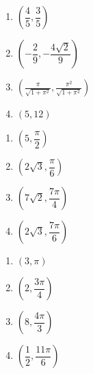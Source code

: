 \documentclass{ximera}
\begin{document}
\begin{multicols}{4} 

\begin{enumerate}

\setcounter{enumi}{\value{HW}}

\item $\left( \dfrac{4}{5}, \dfrac{3}{5} \right)$ 
\item $\left( -\dfrac{2}{9},  -\dfrac{4\sqrt{2}}{9} \right)$
\item $\left( \frac{\pi}{\sqrt{1+\pi^2}}, \frac{\pi^2}{\sqrt{1+\pi^2}} \right)$ 
\item $\left( 5, 12 \right)$ 

\setcounter{HW}{\value{enumi}}

\end{enumerate}

\end{multicols}

\begin{multicols}{4}

\begin{enumerate}

\setcounter{enumi}{\value{HW}}

\item $\left( 5, \dfrac{\pi}{2} \right)$ 
\item $\left( 2\sqrt{3}, \dfrac{\pi}{6} \right)$ 
\item $\left( 7\sqrt{2}, \dfrac{7\pi}{4} \right)$
\item $\left( 2\sqrt{3}, \dfrac{7\pi}{6} \right)$

\setcounter{HW}{\value{enumi}}

\end{enumerate}

\end{multicols}

\begin{multicols}{4}

\begin{enumerate}

\setcounter{enumi}{\value{HW}}

\item $\left( 3, \pi \right)$ 
\item $\left( 2, \dfrac{3\pi}{4} \right)$
\item $\left( 8, \dfrac{4\pi}{3} \right)$
\item $\left( \dfrac{1}{2}, \dfrac{11\pi}{6} \right)$

\setcounter{HW}{\value{enumi}}

\end{enumerate}

\end{multicols}
\end{document}
